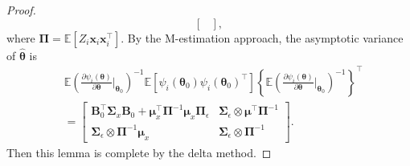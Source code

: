 \documentclass[12pt, A4]{article}
\newcommand{\IdenMat}{\textbf{I}}
\begin{document}
\begin{proof}
\begin{equation*}
\begin{bmatrix}
                    \end{bmatrix},
            \end{equation*}
        where $\boldsymbol{\Pi} = \mathbb{E}\left[ Z_i \textbf{x}_i\textbf{x}_i^{\top} \right]$. 
        By the M-estimation approach, the asymptotic variance of $\hat{\boldsymbol{\theta}}$ is
            \begin{align*}
                &  \mathbb{E} \left( \frac{\partial \psi_i(\boldsymbol{\theta})}{ \partial \boldsymbol{\theta}} \biggr\rvert_{\boldsymbol{\theta}_0} \right)^{-1} 
                    \mathbb{E} [ \psi_i(\boldsymbol{\theta}_0)\psi_i(\boldsymbol{\theta}_0)^{\top} ]
                    \left\{ \mathbb{E} \left( \frac{\partial \psi_i(\boldsymbol{\theta})}{ \partial \boldsymbol{\theta}} \biggr\rvert_{\boldsymbol{\theta}_0} \right)^{-1} \right\}^{\top} \\
                &= \begin{bmatrix}
                        \textbf{B}^{\top}_0 \boldsymbol{\Sigma}_{x} \textbf{B}_0 + \boldsymbol{\mu}_x^{\top} \boldsymbol{\Pi}^{-1} \boldsymbol{\mu}_x \boldsymbol{\Pi}_{\epsilon} &
                        \boldsymbol{\Sigma}_{\epsilon} \otimes \boldsymbol{\mu}^{\top} \boldsymbol{\Pi}^{-1} \\
                        \boldsymbol{\Sigma}_{\epsilon} \otimes \boldsymbol{\Pi}^{-1} \boldsymbol{\mu}_x & \boldsymbol{\Sigma}_{\epsilon} \otimes \boldsymbol{\Pi}^{-1}
                    \end{bmatrix}.
            \end{align*}
            Then this lemma is complete by the delta method.
    \end{proof}
\end{document}
